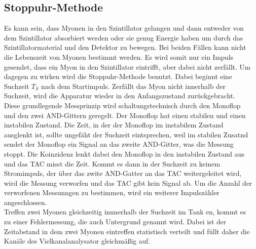 \subsection{Stoppuhr-Methode}
\label{subsec:Messmethode}
Es kann sein, dass Myonen in den Szintillator gelangen und dann entweder von dem Szintillator absorbiert werden oder sie genug 
Energie haben um durch das Szintillatormaterial und den Detektor zu bewegen. Bei beiden Fällen kann nicht die Lebenszeit von Myonen bestimmt werden.
Es wird somit nur ein Impuls gesendet, dass ein Myon in den Szintillator eintrifft, aber dabei nicht zerfällt. Um dagegen zu wirken
wird die Stoppuhr-Methode benutzt. Dabei beginnt eine Suchzeit $T_S$ nach dem Startimpuls. Zerfällt das Myon nicht innerhalb der Suchzeit,
wird die Apparatur wieder in den Anfangszustand zurückgebracht.\\
Diese grundlegende Messprinzip wird schaltungstechnisch durch den Monoflop und den zwei AND-Gittern geregelt.
Der Monoflop hat einen stabilen und einen instabilen Zustand.
Die Zeit, in der der Monoflop im instabilem Zustand ausglenkt ist, sollte ungefäht der Suchzeit eintsprechen, weil im stabilen Zusatnd sendet
der Monoflop ein Signal an das zweite AND-Gitter, was die Messung stoppt.
Die Koinzidenz lenkt dabei den Monoflop in den instabilen Zustand aus und das TAC misst die Zeit. Kommt es dann in der Suchzeit zu keinem
Stromimpuls, der über das zwite AND-Gatter an das TAC weitergeleitet wird, wird die Messung verworfen und das TAC gibt kein Signal ab.
Um die Anzahl der verworfenen Messunngen zu bestimmen, wird ein weiterer Impulszähler angeschlossen.\\
Treffen zwei Myonen gleichzeitig innnerhalb der Suchzeit im Tank en, kommt es zu einer Fehlermessung, die auch Untergrund genannt wird.
Dabei ist der Zeitabstand in dem zwei Myonen eintreffen statistisch verteilt und füllt daher die Kanäle des Vielkanalanalysator gleichmäßig auf.
